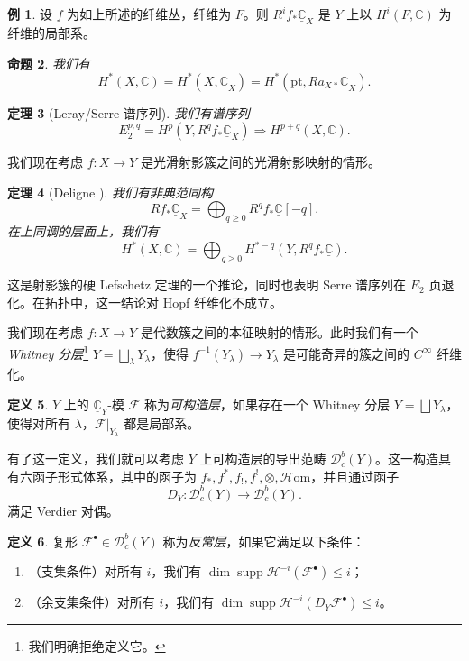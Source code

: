 \documentclass{amsart}
\newtheorem{thm}{定理}[section]
\newtheorem{prop}[thm]{命题}
\theoremstyle{definition}
\newtheorem{defn}[thm]{定义}
\newtheorem{exm}[thm]{例}
\theoremstyle{remark}
\theoremstyle{plain}
\theoremstyle{definition}
\theoremstyle{remark}
\newcommand{\C}{\mathbb{C}}
\newcommand{\mc}[1]{\mathcal{#1}}
\newcommand{\mr}[1]{\mathrm{#1}}
\newcommand{\on}[1]{\operatorname{#1}}
\newcommand{\ul}[1]{\underline{#1}}
\newcommand{\1}{\mathbf{1}}
\newcommand{\2}{\mathbf{2}}
\newcommand{\3}{\mathbf{3}}
\begin{document}
\begin{exm}
    设 \(f\) 为如上所述的纤维丛，纤维为 \(F\)。则 \(R^i f_* \ul{\C}_X\) 是 \(Y\) 上以 \(H^i(F, \C)\) 为纤维的局部系。
\end{exm}

\begin{prop}
    我们有
    \[ H^*(X, \C) = H^*(X, \ul{\C}_X) = H^*(\mr{pt}, R a_{X*} \ul{\C}_X). \]
\end{prop}

\begin{thm}[Leray/Serre 谱序列]
    我们有谱序列
    \[ E_2^{p,q} = H^p(Y, R^q f_* \ul{\C}_X) \Rightarrow H^{p+q}(X, \C). \]
\end{thm}

我们现在考虑 \(f \colon X \to Y\) 是光滑射影簇之间的光滑射影映射的情形。

\begin{thm}[Deligne {\cite{Deligne1968}}]
    我们有非典范同构
    \[ R f_* \ul{\C}_X = \bigoplus_{q \geq 0} R^q f_* \ul{\C}[-q]. \]
    在上同调的层面上，我们有
    \[ H^*(X, \C) = \bigoplus_{q \geq 0} H^{*-q}(Y, R^q f_* \ul{\C}). \]
\end{thm}

这是射影簇的硬 Lefschetz 定理的一个推论，同时也表明 Serre 谱序列在 \(E_2\) 页退化。在拓扑中，这一结论对 Hopf 纤维化不成立。

我们现在考虑 \(f \colon X \to Y\) 是代数簇之间的本征映射的情形。此时我们有一个 \textit{Whitney 分层}\footnote{我们明确拒绝定义它。} \(Y = \bigsqcup_{\lambda} Y_{\lambda}\)，使得 \(f^{-1}(Y_{\lambda}) \to Y_{\lambda}\) 是可能奇异的簇之间的 \(C^{\infty}\) 纤维化。

\begin{defn}
    \(Y\) 上的 \(\ul{\C}_Y\)-模 \(\mc{F}\) 称为\textit{可构造层}，如果存在一个 Whitney 分层 \(Y = \bigsqcup Y_{\lambda}\)，使得对所有 \(\lambda\)，\(\mc{F}|_{Y_{\lambda}}\) 都是局部系。
\end{defn}

有了这一定义，我们就可以考虑 \(Y\) 上可构造层的导出范畴 \(\mc{D}_c^b(Y)\)。这一构造具有六函子形式体系，其中的函子为 \(f_*, f^*, f_!, f^!, \otimes, \mc{H}\mr{om}\)，并且通过函子
\[ D_Y \colon \mc{D}_c^b(Y) \to \mc{D}_c^b(Y). \]
满足 Verdier 对偶。

\begin{defn}
    复形 \(\mc{F}^{\bullet} \in \mc{D}_c^b(Y)\) 称为\textit{反常层}，如果它满足以下条件：
    \begin{enumerate}
        \item （支集条件）对所有 \(i\)，我们有 \(\dim \on{supp} \mc{H}^{-i}(\mc{F}^{\bullet}) \leq i\)；
        \item （余支集条件）对所有 \(i\)，我们有 \(\dim \on{supp} \mc{H}^{-i}(D_Y \mc{F}^{\bullet}) \leq i\)。
    \end{enumerate}
\end{defn}
\end{document}

